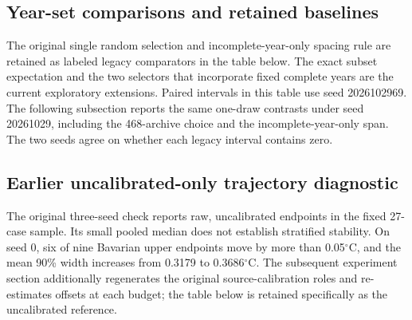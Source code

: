\subsection{Year-set comparisons and retained baselines}
The original single random selection and incomplete-year-only spacing rule are retained as labeled legacy comparators in the table below. The exact subset expectation and the two selectors that incorporate fixed complete years are the current exploratory extensions. Paired intervals in this table use seed 2026102969. The following subsection reports the same one-draw contrasts under seed 20261029, including the 468-archive choice and the incomplete-year-only span. The two seeds agree on whether each legacy interval contains zero.







\subsection{Earlier uncalibrated-only trajectory diagnostic}
The original three-seed check reports raw, uncalibrated endpoints in the fixed 27-case sample. Its small pooled median does not establish stratified stability. On seed 0, six of nine Bavarian upper endpoints move by more than 0.05$^{\circ}$C, and the mean 90\% width increases from 0.3179 to 0.3686$^{\circ}$C. The subsequent experiment section additionally regenerates the original source-calibration roles and re-estimates offsets at each budget; the table below is retained specifically as the uncalibrated reference.

